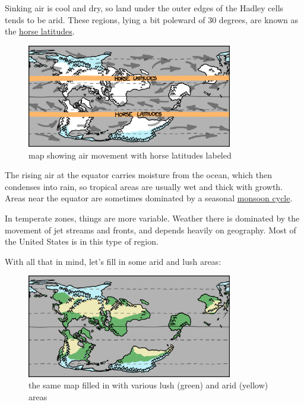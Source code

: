 {Sinking air is cool and dry, so land under the outer edges of the Hadley cells tends to be arid. These regions, lying a bit poleward of 30 degrees, are known as the \href{http://en.wikipedia.org/wiki/Horse\_latitudes}{horse latitudes}.}

\begin{figure}[!htbp]
\centering
\includegraphics[scale=0.5, max width=0.8\textwidth]{imgs/a/10/cassini_horse.png}
\caption{map showing air movement with horse latitudes labeled}
\end{figure}

{The rising air at the equator carries moisture from the ocean, which then condenses into rain, so tropical areas are usually wet and thick with growth. Areas near the equator are sometimes dominated by a seasonal \href{http://en.wikipedia.org/wiki/Monsoon}{monsoon cycle}.}

{In temperate zones, things are more variable. Weather there is dominated by the movement of jet streams and fronts, and depends heavily on geography. Most of the United States is in this type of region.}

{With all that in mind, let’s fill in some arid and lush areas:}

\begin{figure}[!htbp]
\centering
\includegraphics[scale=0.5, max width=0.8\textwidth]{imgs/a/10/cassini_climate.png}
\caption{the same map filled in with various lush (green) and arid (yellow) areas}
\end{figure}

